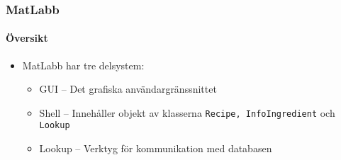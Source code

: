 \begin{frame}
  \frametitle{MatLabb}
  \framesubtitle{Översikt}
  \begin{itemize}
    \item MatLabb har tre delsystem:
      \begin{itemize}
        \item GUI -- Det grafiska användargränssnittet
        \item Shell -- Innehåller objekt av klasserna \texttt{Recipe, InfoIngredient} och \texttt{Lookup}
        \item Lookup -- Verktyg för kommunikation med databasen
      \end{itemize}
  \end{itemize}
\end{frame}
